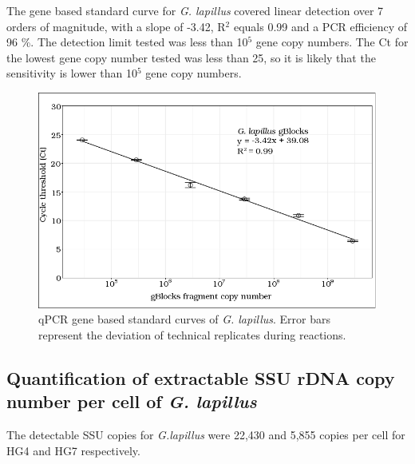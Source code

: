 \documentclass[12pt]{article}
\begin{document}
The gene based standard curve for \emph{G. lapillus} covered linear detection over 7 orders of magnitude, with a slope of -3.42, R$^{2}$ equals 0.99 and a PCR efficiency of 96 \%. 
The detection limit tested was less than 10$^{5}$ gene copy numbers. 
The Ct for the lowest gene copy number tested was less than 25, so it is likely that the sensitivity is lower than 10$^{5}$ gene copy numbers.\\
\begin{figure}
\includegraphics[scale=.8]{Hero_qpcr-figs/Fig3_gblocks-standards.png}
\caption{qPCR gene based standard curves of \emph{G. lapillus}. Error bars represent the deviation of technical replicates during reactions.}%
\label{fig:lapigblocks}
\end{figure}
\FloatBarrier

\FloatBarrier

\subsection*{Quantification of extractable SSU rDNA copy number per cell of \emph{G. lapillus}}%
The detectable SSU copies for \emph{G.lapillus} were 22,430 and 5,855 copies per cell for HG4 and HG7 respectively. 
\end{document}

